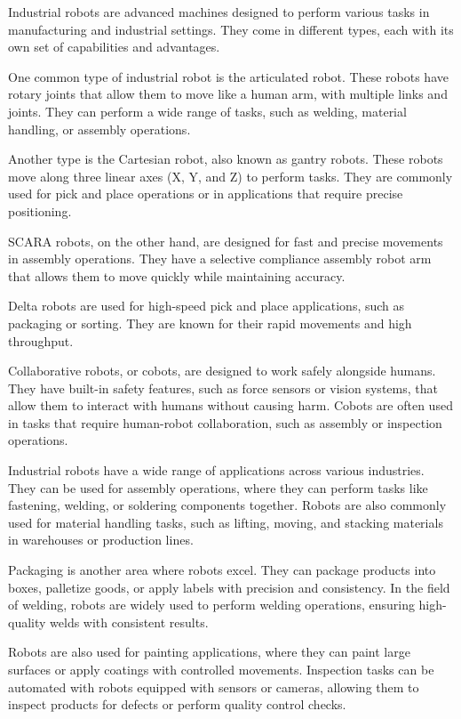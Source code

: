 Industrial robots are advanced machines designed to perform various tasks in manufacturing and industrial settings. They come in different types, each with its own set of capabilities and advantages.

One common type of industrial robot is the articulated robot. These robots have rotary joints that allow them to move like a human arm, with multiple links and joints. They can perform a wide range of tasks, such as welding, material handling, or assembly operations.

Another type is the Cartesian robot, also known as gantry robots. These robots move along three linear axes (X, Y, and Z) to perform tasks. They are commonly used for pick and place operations or in applications that require precise positioning.

SCARA robots, on the other hand, are designed for fast and precise movements in assembly operations. They have a selective compliance assembly robot arm that allows them to move quickly while maintaining accuracy.

Delta robots are used for high-speed pick and place applications, such as packaging or sorting. They are known for their rapid movements and high throughput.

Collaborative robots, or cobots, are designed to work safely alongside humans. They have built-in safety features, such as force sensors or vision systems, that allow them to interact with humans without causing harm. Cobots are often used in tasks that require human-robot collaboration, such as assembly or inspection operations.

Industrial robots have a wide range of applications across various industries. They can be used for assembly operations, where they can perform tasks like fastening, welding, or soldering components together. Robots are also commonly used for material handling tasks, such as lifting, moving, and stacking materials in warehouses or production lines.

Packaging is another area where robots excel. They can package products into boxes, palletize goods, or apply labels with precision and consistency. In the field of welding, robots are widely used to perform welding operations, ensuring high-quality welds with consistent results.

Robots are also used for painting applications, where they can paint large surfaces or apply coatings with controlled movements. Inspection tasks can be automated with robots equipped with sensors or cameras, allowing them to inspect products for defects or perform quality control checks.

